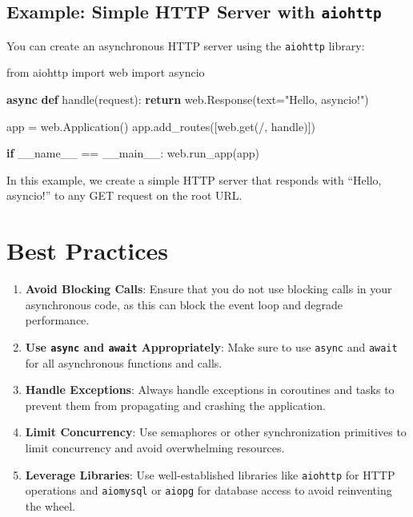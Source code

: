 \documentclass[
  letterpaper,
  DIV=11,
  numbers=noendperiod]{scrreprt}
\newenvironment{Shaded}{\begin{snugshade}}{\end{snugshade}}
\newcommand{\ControlFlowTok}[1]{\textcolor[rgb]{0.00,0.23,0.31}{\textbf{#1}}}
\newcommand{\ImportTok}[1]{\textcolor[rgb]{0.00,0.46,0.62}{#1}}
\newcommand{\KeywordTok}[1]{\textcolor[rgb]{0.00,0.23,0.31}{\textbf{#1}}}
\newcommand{\NormalTok}[1]{\textcolor[rgb]{0.00,0.23,0.31}{#1}}
\newcommand{\OperatorTok}[1]{\textcolor[rgb]{0.37,0.37,0.37}{#1}}
\newcommand{\StringTok}[1]{\textcolor[rgb]{0.13,0.47,0.30}{#1}}
\newcommand{\VariableTok}[1]{\textcolor[rgb]{0.07,0.07,0.07}{#1}}
\providecommand{\tightlist}{%
  \setlength{\itemsep}{0pt}\setlength{\parskip}{0pt}}\usepackage{longtable,booktabs,array}
\begin{document}
\subsection{\texorpdfstring{Example: Simple HTTP Server with
\texttt{aiohttp}}{Example: Simple HTTP Server with aiohttp}}\label{example-simple-http-server-with-aiohttp}

You can create an asynchronous HTTP server using the \texttt{aiohttp}
library:

\begin{Shaded}
\begin{Highlighting}[]
\ImportTok{from}\NormalTok{ aiohttp }\ImportTok{import}\NormalTok{ web}
\ImportTok{import}\NormalTok{ asyncio}

\ControlFlowTok{async} \KeywordTok{def}\NormalTok{ handle(request):}
    \ControlFlowTok{return}\NormalTok{ web.Response(text}\OperatorTok{=}\StringTok{"Hello, asyncio!"}\NormalTok{)}

\NormalTok{app }\OperatorTok{=}\NormalTok{ web.Application()}
\NormalTok{app.add\_routes([web.get(}\StringTok{\textquotesingle{}/\textquotesingle{}}\NormalTok{, handle)])}

\ControlFlowTok{if} \VariableTok{\_\_name\_\_} \OperatorTok{==} \StringTok{\textquotesingle{}\_\_main\_\_\textquotesingle{}}\NormalTok{:}
\NormalTok{    web.run\_app(app)}
\end{Highlighting}
\end{Shaded}

In this example, we create a simple HTTP server that responds with
``Hello, asyncio!'' to any GET request on the root URL.

\section{Best Practices}\label{best-practices-2}

\begin{enumerate}
\def\labelenumi{\arabic{enumi}.}
\tightlist
\item
  \textbf{Avoid Blocking Calls}: Ensure that you do not use blocking
  calls in your asynchronous code, as this can block the event loop and
  degrade performance.
\item
  \textbf{Use \texttt{async} and \texttt{await} Appropriately}: Make
  sure to use \texttt{async} and \texttt{await} for all asynchronous
  functions and calls.
\item
  \textbf{Handle Exceptions}: Always handle exceptions in coroutines and
  tasks to prevent them from propagating and crashing the application.
\item
  \textbf{Limit Concurrency}: Use semaphores or other synchronization
  primitives to limit concurrency and avoid overwhelming resources.
\item
  \textbf{Leverage Libraries}: Use well-established libraries like
  \texttt{aiohttp} for HTTP operations and \texttt{aiomysql} or
  \texttt{aiopg} for database access to avoid reinventing the wheel.
\end{enumerate}
\end{document}
